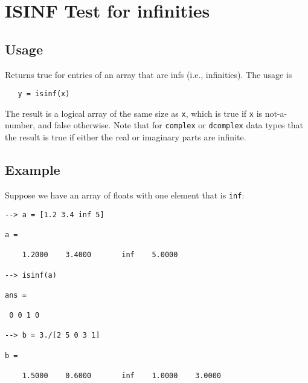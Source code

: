 \section{ISINF Test for infinities}

\subsection{Usage}

Returns true for entries of an array that are infs (i.e.,
infinities).  The usage is
\begin{verbatim}
   y = isinf(x)
\end{verbatim}
The result is a logical array of the same size as \verb|x|,
which is true if \verb|x| is not-a-number, and false otherwise.
Note that for \verb|complex| or \verb|dcomplex| data types that
the result is true if either the real or imaginary parts
are infinite.
\subsection{Example}

Suppose we have an array of floats with one element that
is \verb|inf|:
\begin{verbatim}
--> a = [1.2 3.4 inf 5]

a = 

    1.2000    3.4000       inf    5.0000 

--> isinf(a)

ans = 

 0 0 1 0 

--> b = 3./[2 5 0 3 1]

b = 

    1.5000    0.6000       inf    1.0000    3.0000 
\end{verbatim}
